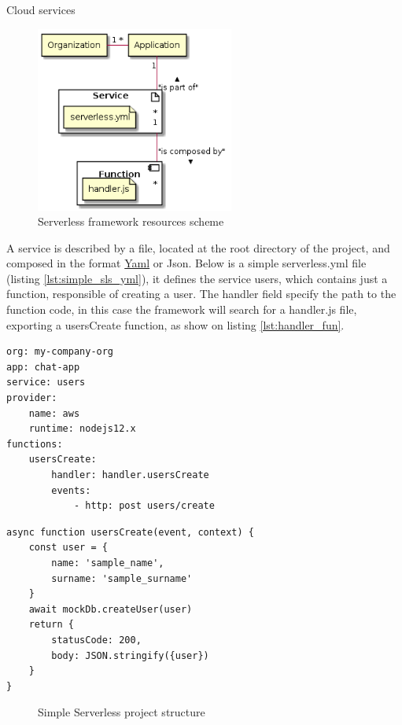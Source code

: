 \begin{chapter}{Cloud services}
    \begin{figure}
        \centering
        \includegraphics[width=6.5cm]{source/diagrams/serverless_app_service.png}
        \caption{Serverless framework resources scheme}
        \label{fig:sls_resource_scheme}
    \end{figure}

    A service is described by a file, located at the root directory of the project,
    and composed in the format \href{https://yaml.org/}{Yaml} or Json.
    Below is a simple serverless.yml file (listing \ref{lst:simple_sls_yml}), it
    defines the service users, which contains just a function, responsible of creating
    a user. The handler field specify the path to the function code, in this case
    the framework will search for a handler.js file, exporting a usersCreate function,
    as show on listing \ref{lst:handler_fun}.

    \bigskip
    \begin{lstlisting}[caption=Simple serverless.yml file, label={lst:simple_sls_yml}]
org: my-company-org
app: chat-app
service: users
provider:
    name: aws
    runtime: nodejs12.x
functions:
    usersCreate:
        handler: handler.usersCreate
        events:
            - http: post users/create
    \end{lstlisting}

    \begin{lstlisting}[caption=Simple handler function, label={lst:handler_fun}]
async function usersCreate(event, context) {
    const user = {
        name: 'sample_name',
        surname: 'sample_surname'
    }
    await mockDb.createUser(user)
    return {
        statusCode: 200,
        body: JSON.stringify({user})
    }
}
    \end{lstlisting}

    \begin{figure}
        \caption{Simple Serverless project structure}
        \label{fig:sls_project_structure}
        \begin{minipage}{\linewidth}
        \end{minipage}
    \end{figure}


\end{chapter}
